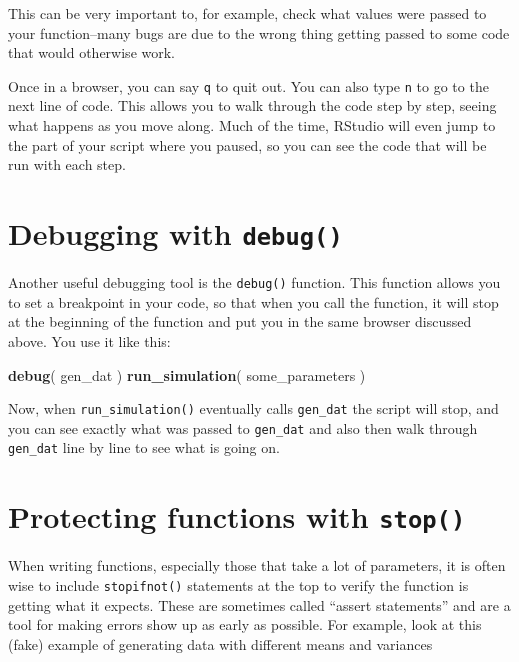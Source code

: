 \documentclass[
]{book}
\newenvironment{Shaded}{\begin{snugshade}}{\end{snugshade}}
\newcommand{\FunctionTok}[1]{\textcolor[rgb]{0.13,0.29,0.53}{\textbf{#1}}}
\newcommand{\NormalTok}[1]{#1}
\begin{document}
This can be very important to, for example, check what values were passed to your function--many bugs are due to the wrong thing getting passed to some code that would otherwise work.

Once in a browser, you can say \texttt{q} to quit out.
You can also type \texttt{n} to go to the next line of code.
This allows you to walk through the code step by step, seeing what happens as you move along.
Much of the time, RStudio will even jump to the part of your script where you paused, so you can see the code that will be run with each step.

\section{\texorpdfstring{Debugging with \texttt{debug()}}{Debugging with debug()}}\label{debugging-with-debug}

Another useful debugging tool is the \texttt{debug()} function.
This function allows you to set a breakpoint in your code, so that when you call the function, it will stop at the beginning of the function and put you in the same browser discussed above.
You use it like this:

\begin{Shaded}
\begin{Highlighting}[]
\FunctionTok{debug}\NormalTok{( gen\_dat )}
\FunctionTok{run\_simulation}\NormalTok{( some\_parameters )}
\end{Highlighting}
\end{Shaded}

Now, when \texttt{run\_simulation()} eventually calls \texttt{gen\_dat} the script will stop, and you can see exactly what was passed to \texttt{gen\_dat} and also then walk through \texttt{gen\_dat} line by line to see what is going on.

\section{\texorpdfstring{Protecting functions with \texttt{stop()}}{Protecting functions with stop()}}\label{about-stopifnot}

When writing functions, especially those that take a lot of parameters, it is often wise to include \texttt{stopifnot()} statements at the top to verify the function is getting what it expects.
These are sometimes called ``assert statements'' and are a tool for making errors show up as early as possible.
For example, look at this (fake) example of generating data with different means and variances
\end{document}
